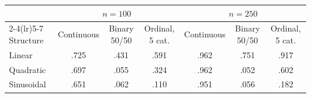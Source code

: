 \begin{tabular}{lcccccc}
\toprule
 & \multicolumn{3}{c}{$n = 100$} & \multicolumn{3}{c}{$n = 250$} \\
\cmidrule(lr){2-4}\cmidrule(lr){5-7}
Structure & Continuous & Binary 50/50 & Ordinal, 5 cat. & Continuous & Binary 50/50 & Ordinal, 5 cat. \\
\midrule
Linear & .725 & .431 & .591 & .962 & .751 & .917 \\
Quadratic & .697 & .055 & .324 & .962 & .052 & .602 \\
Sinusoidal & .651 & .062 & .110 & .951 & .056 & .182 \\
\bottomrule
\end{tabular}
